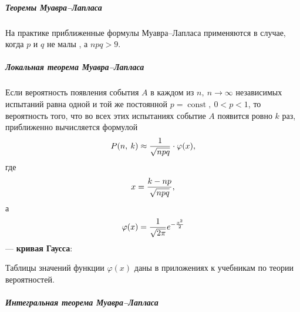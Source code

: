\documentclass[a4paper]{article}
\DeclareMathOperator{\const}{const}
\newcommand{\sqrtt}[1]{\sqrt{\vphantom{qb} #1}}
\newcommand{\key}[1]{{\color{Medium}\bfseries #1}}
\begin{document}
                    \subparagraph{Теоремы Муавра--Лапласа}

                        На практике приближенные формулы Муавра--Лапласа применяются в случае, когда $p$ и $q$ не малы , а $n p q > 9$.

                    \subparagraph{Локальная теорема Муавра--Лапласа}

                        Если вероятность появления события $A$ в каждом из $n, \: n \to \infty$ независимых испытаний равна одной и той же постоянной $p = \const , \: 0 < p < 1$, то вероятность того, что во всех этих испытаниях событие $A$ появится ровно $k$ раз, приближенно вычисляется формулой
                        \begin{equation*}
                            P(n, \: k) \approx \frac{1}{\sqrtt{n p q}} \cdot \varphi (x) ,
                        \end{equation*}
                        где
                        \begin{equation*}
                            x = \frac{k - n p}{\sqrtt{n p q}} ,
                        \end{equation*}
                        а
                        \begin{equation*}
                            \varphi (x) = \frac{1}{\sqrtt{2 \pi}} e^{-\frac{x^2}{2}}
                        \end{equation*}
                        --- \key{кривая Гаусса}:

                        \vspace{2.0ex}


                        Таблицы значений функции $\varphi (x)$ даны в приложениях к учебникам по теории вероятностей.

                    \subparagraph{Интегральная теорема Муавра--Лапласа}
\end{document}
